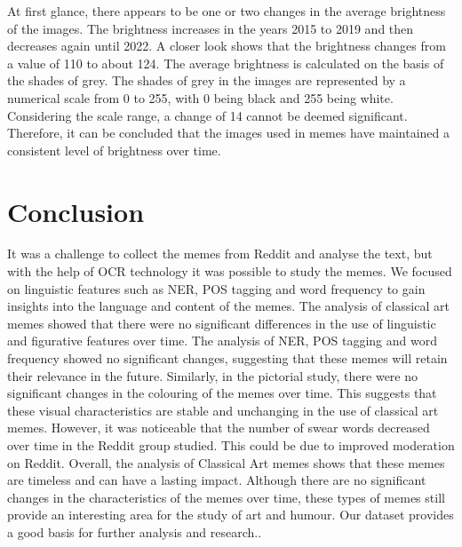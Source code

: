 \documentclass[11pt,a4paper]{article}
\begin{document}
At first glance, there appears to be one or two changes in the average brightness of the images. The brightness increases in the years 2015 to 2019 and then decreases again until 2022. A closer look shows that the brightness changes from a value of 110 to about 124. The average brightness is calculated on the basis of the shades of grey. The shades of grey in the images are represented by a numerical scale from 0 to 255, with 0 being black and 255 being white. Considering the scale range, a change of 14 cannot be deemed significant. Therefore, it can be concluded that the images used in memes have maintained a consistent level of brightness over time.

 \section{Conclusion}
It was a challenge to collect the memes from Reddit and analyse the text, but with the help of OCR technology it was possible to study the memes. We focused on linguistic features such as NER, POS tagging and word frequency to gain insights into the language and content of the memes. The analysis of classical art memes showed that there were no significant differences in the use of linguistic and figurative features over time. The analysis of NER, POS tagging and word frequency showed no significant changes, suggesting that these memes will retain their relevance in the future.
Similarly, in the pictorial study, there were no significant changes in the colouring of the memes over time. This suggests that these visual characteristics are stable and unchanging in the use of classical art memes.
However, it was noticeable that the number of swear words decreased over time in the Reddit group studied. This could be due to improved moderation on Reddit.
Overall, the analysis of Classical Art memes shows that these memes are timeless and can have a lasting impact. Although there are no significant changes in the characteristics of the memes over time, these types of memes still provide an interesting area for the study of art and humour.
Our dataset provides a good basis for further analysis and research.. 
 
\end{document}
